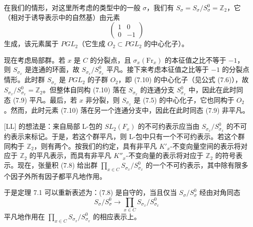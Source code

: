 \documentclass[11pt,a4paper]{article}
\begin{document}
在我们的情形，对这里所考虑的类型中的一般 $\sigma$，我们有 $S_\sigma=S_\sigma/S_\sigma^0=\mathbb{Z}_2$，它（相对于诱导表示中的自然基）由元素
\begin{equation}\tag{7.10}
\begin{pmatrix}1&0\\ 0&-1\end{pmatrix}
\end{equation}
生成，该元素属于 $PGL_2$（它生成 $O_2\subset PGL_2$ 的中心化子）。

现在考虑局部群。若 $x$ 是 $C$ 的分裂点，且 $\sigma_x(\mathrm{Fr}_x)$ 的本征值之比不等于 $-1$，则 $S_{\sigma_x}$ 是连通的环面，故 $S_{\sigma_x}/S_{\sigma_x}^0$ 平凡。接下来考虑本征值之比等于 $-1$ 的分裂点情形。此时群 $S_{\sigma_x}$ 是 $PGL_2$ 的子群 $O_2$，即 (7.10) 的中心化子（见公式 (7.6)），故 $S_{\sigma_x}/S_{\sigma_x}^0=\mathbb{Z}_2$。但整体自同构 (7.10) 落在 $S_{\sigma_x}$ 的连通分支 $S_{\sigma_x}^0$ 中，因此在此时同态 (7.9) 平凡。最后，若 $x$ 非分裂，则 $S_{\sigma_x}$ 是 (7.5) 的中心化子，它也同构于 $O_2$。然而，此时元素 (7.10) 落在另一个连通分支中，因此在此时同态 (7.9) 非平凡。

[LL] 的想法是：来自局部 L-包的 $SL_2(F_x)$ 的不可约表示应当由 $S_{\sigma_x}/S_{\sigma_x}^0$ 的不可约表示来标记。于是，若这个群平凡，则 L-包中只有一个不可约表示。若这个群同构于 $\mathbb{Z}_2$，则有两个。按我们的约定，具有非平凡 $K'_x$-不变向量空间的表示将对应于 $\mathbb{Z}_2$ 的平凡表示，而具有非平凡 $K''_x$-不变向量的表示将对应于 $\mathbb{Z}_2$ 的符号表示。现在，张量积 (7.8) 给出群 $\prod_{x\in C}S_{\sigma_x}/S_{\sigma_x}^0$ 的一个不可约表示，其中除有限多个因子外所有因子都平凡地作用。


于是定理 7.1 可以重新表述为：(7.8) 是自守的，当且仅当 $S_\sigma/S_\sigma^0$ 经由对角同态
\[
S_\sigma/S_\sigma^0\to\prod_{x\in C}S_{\sigma_x}/S_{\sigma_x}^0
\]
平凡地作用在 $\prod_{x\in C}S_{\sigma_x}/S_{\sigma_x}^0$ 的相应表示上。
\end{document}
